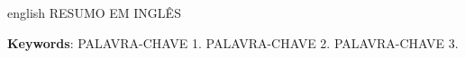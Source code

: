 \begin{resumo}[Abstract]
	\begin{otherlanguage*}{english}
	RESUMO EM INGLÊS

		\vspace*{1\onelineskip}
 
		\textbf{Keywords}: PALAVRA-CHAVE 1. PALAVRA-CHAVE 2. PALAVRA-CHAVE 3.
	\end{otherlanguage*}
\end{resumo}